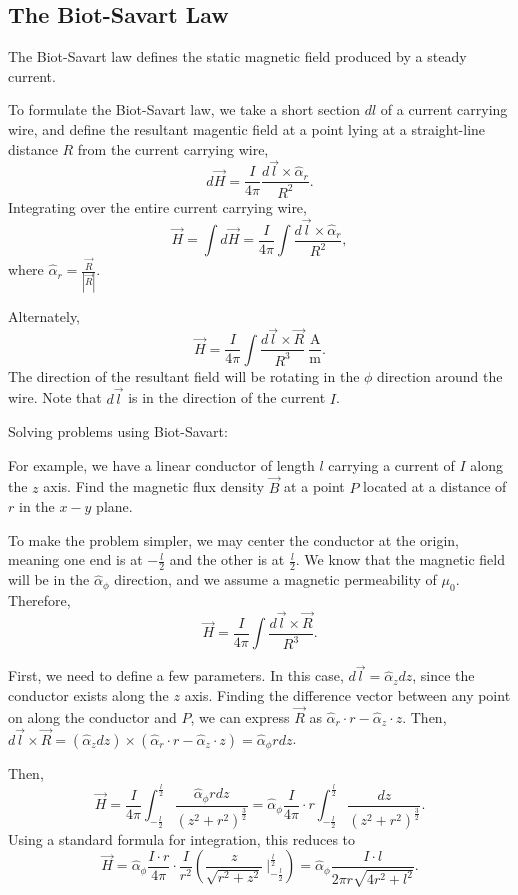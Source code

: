 \documentclass{article}
\begin{document}
\subsection{The Biot-Savart Law}
The Biot-Savart law defines the static magnetic field produced by a steady current. 

To formulate the Biot-Savart law, we take a short section \(dl\) of a current carrying wire, and define the resultant magentic field at a point lying at a straight-line distance \(R\) from the current carrying wire, 
\[
	d \vec{H} = \frac{I}{4\pi}\frac{d \vec{l} \times \hat{\alpha}_r}{R^2}.
\]
Integrating over the entire current carrying wire, 
\[
  \vec{H} = \int d \vec{H} = \frac{I}{4\pi} \int \frac{d \vec{l}\times \hat{\alpha}_r}{R^2},
\]
where \(\hat{\alpha}_r = \frac{\vec{R}}{|\vec{R}|}\).

Alternately, 
\[
\vec{H} = \frac{I}{4\pi} \int \frac{d \vec{l} \times \vec{R}}{R^3} \ \mathrm{\frac{A}{m}}.
\]
The direction of the resultant field will be rotating in the \(\phi\) direction around the wire. Note that \(d \vec{l}\) is in the direction of the current \(I\).

Solving problems using Biot-Savart:

For example, we have a linear conductor of length \(l\) carrying a current of \(I\) along the \(z\) axis. Find the magnetic flux density \(\vec{B}\) at a point \(P\) located at a distance of \(r\) in the \(x-y\) plane.

To make the problem simpler, we may center the conductor at the origin, meaning one end is at \(-\frac{l}{2}\) and the other is at \(\frac{l}{2}\). We know that the magnetic field will be in the \(\hat{\alpha}_\phi\) direction, and we assume a magnetic permeability of \(\mu_0\). Therefore, 
\[
  \vec{H} = \frac{I}{4\pi} \int \frac{d \vec{l} \times \vec{R}}{R^3}.
\]

First, we need to define a few parameters. In this case, \(d \vec{l} = \hat{\alpha}_z dz\), since the conductor exists along the \(z\) axis. Finding the difference vector between any point on along the conductor and \(P\), we can express \(\vec{R}\) as \(\hat{\alpha}_r \cdot r - \hat{\alpha}_z \cdot z\). Then, \(d \vec{l} \times \vec{R} = (\hat{\alpha}_z dz) \times (\hat{\alpha}_r \cdot r - \hat{\alpha}_z \cdot z) = \hat{\alpha}_\phi r dz\).

Then, 
\[
	\vec{H} = \frac{I}{4\pi}\int_{-\frac{l}{2}}^{\frac{l}{2}} \frac{\hat{\alpha}_\phi r dz}{(z^2 + r^2)^{\frac{3}{2}}} = \hat{\alpha}_\phi \frac{I}{4\pi}\cdot r \int_{-\frac{l}{2}}^{\frac{l}{2}} \frac{dz}{(z^2 + r^2)^{\frac{3}{2}}}.
\]
Using a standard formula for integration, this reduces to
\[
	\vec{H} = \hat{\alpha}_\phi \frac{I\cdot r}{4\pi} \cdot \frac{I}{r^2}(\frac{z}{\sqrt{r^2+z^2}} \ \Big|_{-\frac{l}{2}}^{\frac{l}{2}}) = \hat{\alpha}_\phi \frac{I\cdot l}{2\pi r \sqrt{4r^2 + l^2}}.
\]
\end{document}
